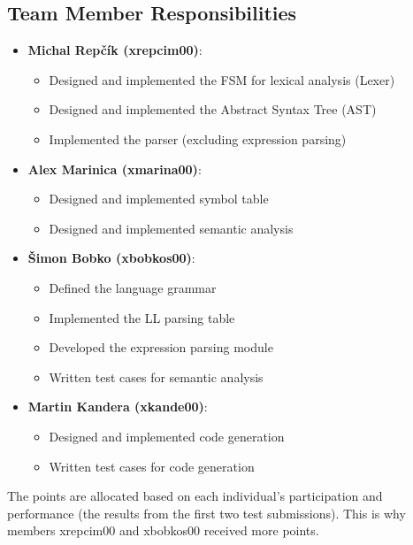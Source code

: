 \documentclass[12pt,a4paper]{article}
\begin{document}
\subsection{Team Member Responsibilities}
\begin{itemize}
    \item \textbf{Michal Repčík (xrepcim00)}: 
    \begin{itemize}
        \item Designed and implemented the FSM for lexical analysis (Lexer)
        \item Designed and implemented the Abstract Syntax Tree (AST)
        \item Implemented the parser (excluding expression parsing)
    \end{itemize}
    \item \textbf{Alex Marinica (xmarina00)}: 
    \begin{itemize}
        \item Designed and implemented symbol table
        \item Designed and implemented semantic analysis 
    \end{itemize}
    \item \textbf{Šimon Bobko (xbobkos00)}: 
    \begin{itemize}
        \item Defined the language grammar
        \item Implemented the LL parsing table
        \item Developed the expression parsing module
        \item Written test cases for semantic analysis
    \end{itemize}
    \item \textbf{Martin Kandera (xkande00)}: 
    \begin{itemize}
        \item Designed and implemented code generation
        \item Written test cases for code generation
    \end{itemize}
\end{itemize}

The points are allocated based on each individual's participation and performance (the results from the first two test submissions). This is why members xrepcim00 and xbobkos00 received more points. 
\end{document}
